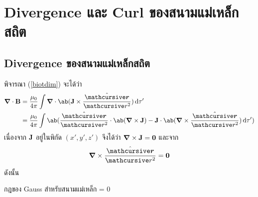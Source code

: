 \section{Divergence และ Curl ของสนามแม่เหล็กสถิต}
\subsection{Divergence ของสนามแม่เหล็กสถิต}
พิจารณา (\ref{biotdim}) จะได้ว่า
\begin{align*}
    \gd\cdot\vb{B} &= \frac{\mu_0}{4\pi}\int\gd\cdot\ab(\vb{J}\times\frac{\vus{\rad}}{\rad^2})\odif{\tau'}\\
    &= \frac{\mu_0}{4\pi}\int\ab(\frac{\vus{\rad}}{\rad^2}\cdot\ab(\gd\times\vb{J})-\vb{J}\cdot\ab(\gd\times\frac{\vus{\rad}}{\rad^2})\odif{\tau'})
\end{align*}
เนื่องจาก $\mathbf{J}$ อยู่ในพิกัด $(x',y',z')$ จึงได้ว่า $\boldsymbol{\nabla}\times\mathbf{J}=\mathbf{0}$ และจาก
\[
\gd\times\frac{\vus{\rad}}{\rad^2} = \vb{0}
\]
ดังนั้น
\begin{ieqbox}{กฎของ Gauss สำหรับสนามแม่เหล็ก}
    \gd\cdot{} = 0\label{gaussb}
\end{ieqbox}
